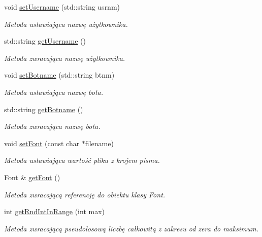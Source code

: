 \begin{DoxyCompactItemize}
void \mbox{\hyperlink{class_settings_container_a8badba41708e07b0af50e30f1e0bc78a}{set\+Username}} (std\+::string usrnm)
\begin{DoxyCompactList}\small\item\em Metoda ustawiająca nazwę użytkownika. \end{DoxyCompactList}\item 
std\+::string \mbox{\hyperlink{class_settings_container_a6a78401d4c64c4e67075a7af2c8b240f}{get\+Username}} ()
\begin{DoxyCompactList}\small\item\em Metoda zwracająca nazwę użytkownika. \end{DoxyCompactList}\item 
void \mbox{\hyperlink{class_settings_container_a0863865f0c29a22cb94786a9d06ab8e5}{set\+Botname}} (std\+::string btnm)
\begin{DoxyCompactList}\small\item\em Metoda ustawiająca nazwę bota. \end{DoxyCompactList}\item 
std\+::string \mbox{\hyperlink{class_settings_container_af21c7896a30afa72225b8909f1f71260}{get\+Botname}} ()
\begin{DoxyCompactList}\small\item\em Metoda zwracająca nazwę bota. \end{DoxyCompactList}\item 
void \mbox{\hyperlink{class_settings_container_aea46f6b09eac8277d8dc937206161d6d}{set\+Font}} (const char $\ast$filename)
\begin{DoxyCompactList}\small\item\em Metoda ustawiająca wartość pliku z krojem pisma. \end{DoxyCompactList}\item 
Font \& \mbox{\hyperlink{class_settings_container_a0ea0234fe36457683a5714cab61600db}{get\+Font}} ()
\begin{DoxyCompactList}\small\item\em Metoda zwracającą referencję do obiektu klasy Font. \end{DoxyCompactList}\item 
int \mbox{\hyperlink{class_settings_container_ad3e3381e90f32532403ef7bc390ca0a1}{get\+Rnd\+Int\+In\+Range}} (int max)
\begin{DoxyCompactList}\small\item\em Metoda zwracającą pseudolosową liczbę całkowitą z zakresu od zera do maksimum. \end{DoxyCompactList}\end{DoxyCompactItemize}
